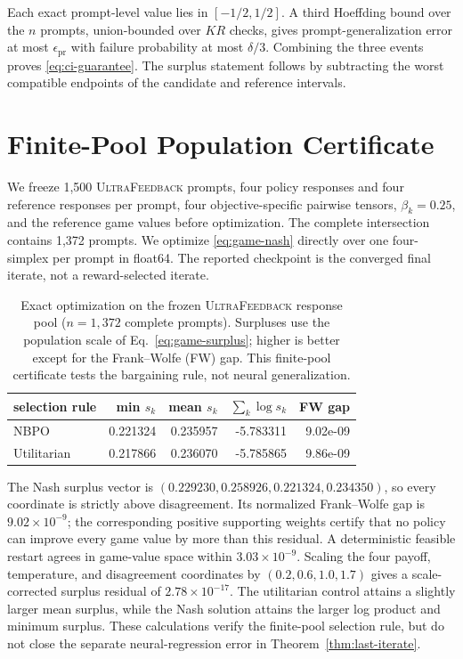 \documentclass{article}
\theoremstyle{remark}
\theoremstyle{plain}
\newcommand{\NBPO}{\textsc{NBPO}}
\begin{document}
Each exact prompt-level value lies in $[-1/2,1/2]$. A third Hoeffding bound over the $n$ prompts, union-bounded over $KR$ checks, gives prompt-generalization error at most $\epsilon_{\mathrm{pr}}$ with failure probability at most $\delta/3$. Combining the three events proves \eqref{eq:ci-guarantee}. The surplus statement follows by subtracting the worst compatible endpoints of the candidate and reference intervals.

\section{Finite-Pool Population Certificate}
\label{app:finite-pool-certificate}

We freeze 1,500 \textsc{UltraFeedback} prompts, four policy responses and four reference responses per prompt, four objective-specific pairwise tensors, $\beta_k=0.25$, and the reference game values before optimization. The complete intersection contains 1,372 prompts. We optimize \eqref{eq:game-nash} directly over one four-simplex per prompt in float64. The reported checkpoint is the converged final iterate, not a reward-selected iterate.

\begin{table}[t]
\centering\footnotesize
\setlength{\tabcolsep}{4.5pt}
\caption{Exact optimization on the frozen \textsc{UltraFeedback} response pool ($n=1{,}372$ complete prompts). Surpluses use the population scale of Eq.~\eqref{eq:game-surplus}; higher is better except for the Frank--Wolfe (FW) gap. This finite-pool certificate tests the bargaining rule, not neural generalization.}
\label{tab:finite-pool-certificate}
\begin{tabular}{lrrrr}
\toprule
selection rule & min $s_k$ & mean $s_k$ & $\sum_k\log s_k$ & FW gap \\
\midrule
\NBPO{} & 0.221324 & 0.235957 & -5.783311 & 9.02e-09 \\
Utilitarian & 0.217866 & 0.236070 & -5.785865 & 9.86e-09 \\
\bottomrule
\end{tabular}
\end{table}

The Nash surplus vector is $(0.229230,0.258926,0.221324,0.234350)$, so every coordinate is strictly above disagreement. Its normalized Frank--Wolfe gap is $9.02\times10^{-9}$; the corresponding positive supporting weights certify that no policy can improve every game value by more than this residual. A deterministic feasible restart agrees in game-value space within $3.03\times10^{-9}$. Scaling the four payoff, temperature, and disagreement coordinates by $(0.2,0.6,1.0,1.7)$ gives a scale-corrected surplus residual of $2.78\times10^{-17}$. The utilitarian control attains a slightly larger mean surplus, while the Nash solution attains the larger log product and minimum surplus. These calculations verify the finite-pool selection rule, but do not close the separate neural-regression error in Theorem~\ref{thm:last-iterate}.
\end{document}
